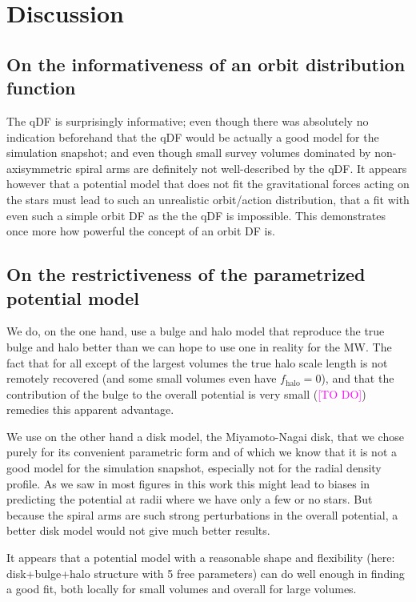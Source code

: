 \documentclass[iop,revtex4,numberedappendix,appendixfloats]{emulateapj}
\newcommand{\Wilma}[1]{\textcolor{Magenta}{#1}}
\begin{document}
\section{Discussion} \label{sec:discussion}

\subsection{On the informativeness of an orbit distribution function}

The qDF is surprisingly informative; even though there was absolutely no indication beforehand that the qDF would be actually a good model for the simulation snapshot; and even though small survey volumes dominated by non-axisymmetric spiral arms are definitely not well-described by the qDF. It appears however that a potential model that does not fit the gravitational forces acting on the stars must lead to such an unrealistic orbit/action distribution, that a fit with even such a simple orbit DF as the the qDF is impossible. This demonstrates once more how powerful the concept of an orbit DF is.

\subsection{On the restrictiveness of the parametrized potential model}

We do, on the one hand, use a bulge and halo model that reproduce the true bulge and halo better than we can hope to use one in reality for the MW. The fact that for all except of the largest volumes the true halo scale length is not remotely recovered (and some small volumes even have $f_\text{halo}=0$), and that the contribution of the bulge to the overall potential is very small (\Wilma{[TO DO]}) remedies this apparent advantage. 

We use on the other hand a disk model, the Miyamoto-Nagai disk, that we chose purely for its convenient parametric form and of which we know that it is not a good model for the simulation snapshot, especially not for the radial density profile. As we saw in most figures in this work this might lead to biases in predicting the potential at radii where we have only a few or no stars. But because the spiral arms are such strong perturbations in the overall potential, a better disk model would not give much better results.

It appears that a potential model with a reasonable shape and flexibility (here: disk+bulge+halo structure with 5 free parameters) can do well enough in finding a good fit, both locally for small volumes and overall for large volumes.
\end{document}
